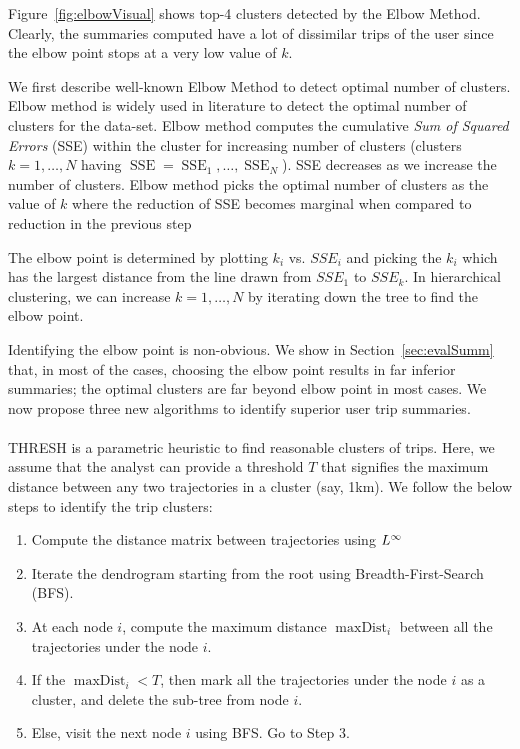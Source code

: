 Figure~\ref{fig:elbowVisual} shows top-4 clusters detected by the Elbow Method. Clearly, the summaries computed have a lot of dissimilar trips of the user since the elbow point stops at a very low value of $k$.

We first describe well-known Elbow Method to detect optimal number of clusters. Elbow method is widely used in literature to detect the optimal number of clusters for the data-set. Elbow method computes the cumulative \textit{Sum of Squared Errors} (SSE) within the cluster for increasing number of clusters (clusters $k=1,\ldots,N$ having $\operatorname{SSE}=\operatorname{SSE}_1,\ldots,\operatorname{SSE}_N$). SSE decreases as we increase the number of clusters. Elbow method picks the optimal number of clusters as the value of $k$ where the reduction of SSE becomes marginal when compared to reduction in the previous step

The elbow point is determined by plotting $k_i$ vs. $SSE_i$ and picking the $k_i$ which has the largest distance from the line drawn from $SSE_1$ to $SSE_k$. In hierarchical clustering, we can increase $k=1,\dots,N$ by iterating down the tree to find the elbow point.

Identifying the elbow point is non-obvious. We show in Section~\ref{sec:evalSumm} that, in most of the cases, choosing the elbow point results in far inferior summaries; the optimal clusters are far beyond elbow point in most cases. We now propose three new algorithms to identify superior user trip summaries.

\paragraph{\thresh}
\label{sec:thresh}
THRESH is a parametric heuristic to find reasonable clusters of trips. Here, we assume that the analyst can provide a threshold $T$ that signifies the maximum distance between any two trajectories in a cluster (say, \unit{1}{km}). We follow the below steps to identify the trip clusters:
\begin{enumerate}[label=S\arabic*:,topsep=0pt,itemsep=-1ex,partopsep=1ex,parsep=1ex]
\item Compute the distance matrix between trajectories using $L^\infty$
\item Iterate the dendrogram starting from the root using Breadth-First-Search (BFS).
\item At each node $i$, compute the maximum distance $\operatorname{maxDist}_i$ between all the trajectories under the node $i$. 
\item If the $\operatorname{maxDist}_i < T$, then mark all the trajectories under the node $i$ as a cluster, and delete the sub-tree from node $i$.
\item Else, visit the next node $i$ using BFS. Go to Step 3.
\end{enumerate}

